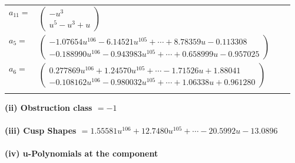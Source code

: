 \documentclass[1p]{elsarticle_modified}
\theoremstyle{definition}
\begin{document}
\begin{tabular}{m{7pt} m{180pt} m{7pt} m{180pt} }
\flushright $a_{11}=$&$\begin{pmatrix}- u^3\\u^5- u^3+u\end{pmatrix}$ \\
\flushright $a_{5}=$&$\begin{pmatrix}-1.07654 u^{106}-6.14521 u^{105}+\cdots+8.78359 u-0.113308\\-0.188990 u^{106}-0.943983 u^{105}+\cdots+0.658999 u-0.957025\end{pmatrix}$ \\
\flushright $a_{6}=$&$\begin{pmatrix}0.277869 u^{106}+1.24570 u^{105}+\cdots-1.71526 u+1.88041\\-0.108162 u^{106}-0.980032 u^{105}+\cdots+1.06338 u+0.961280\end{pmatrix}$\\&\end{tabular}
\flushleft \textbf{(ii) Obstruction class $= -1$}\\~\\
\flushleft \textbf{(iii) Cusp Shapes $= 1.55581 u^{106}+12.7480 u^{105}+\cdots-20.5992 u-13.0896$}\\~\\
\newpage\renewcommand{\arraystretch}{1}
\flushleft \textbf{(iv) u-Polynomials at the component}\newline \\
\end{document}
